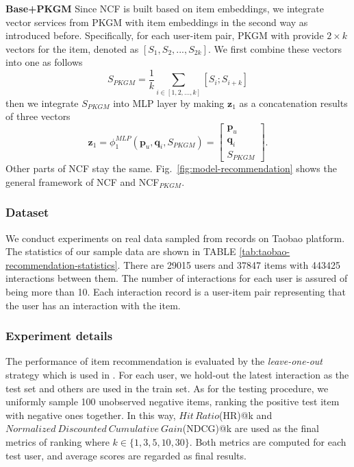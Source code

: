 \textbf{Base+PKGM}
Since NCF is built based on item embeddings, we integrate  vector services from PKGM with item embeddings in the second way as introduced before. Specifically, for each user-item pair, PKGM with provide $2\times k$ vectors for the item, denoted as $[S_1, S_2, ..., S_{2k}]$. We first combine these vectors into one as follows
\begin{equation}
    S_{PKGM} = \frac{1}{k} \sum_{i \in [1, 2, ..., k]} [S_i;S_{i + k}]
\end{equation}
then we integrate $S_{PKGM}$ into MLP layer by making $\mathbf{z}_1$ as a concatenation results of three vectors
\begin{equation}
    \mathbf{z}_1 = \phi _1 ^{MLP} (\mathbf{p}_u, \mathbf{q}_i, S_{PKGM}) = {
\left[ \begin{array}{ccc}
\mathbf{p}_u \\
\mathbf{q}_i \\
S_{PKGM} 
\end{array} 
\right ]}.
\end{equation}
Other parts of NCF stay the same. Fig.~\ref{fig:model-recommendation} shows the general framework of NCF and NCF$_{PKGM}$. 

\subsubsection{Dataset}
We conduct experiments on real data sampled from records on Taobao platform. The statistics of our sample data are shown in TABLE \ref{tab:taobao-recommendation-statistics}. There are 29015 users and 37847 items with 443425 interactions between them. The number of interactions for each user is assured of being more than 10. Each interaction record is a user-item pair representing that the user has an interaction with the item.


\subsubsection{Experiment details}
The performance of item recommendation is evaluated by the \textit{leave-one-out} strategy which is used in \cite{DBLP:conf/www/HeLZNHC17}. For each user, we hold-out the latest interaction as the test set and others are used in the train set. As for the testing procedure, we uniformly sample 100 unobserved negative items, ranking the positive test item with negative ones together. In this way, $Hit\,Ratio$(HR)@k and $Normalized\ Discounted\ Cumulative\ Gain $(NDCG)@k are used as the final metrics of ranking where $k \in \{1,3,5,10,30\}$. Both metrics are computed for each test user, and average scores are regarded as final results.

